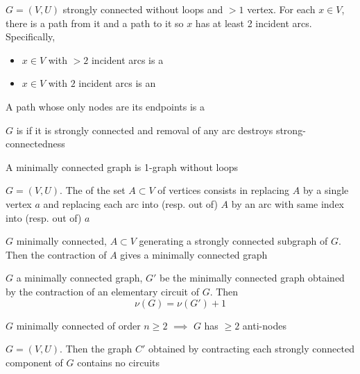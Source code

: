 \documentclass[aspectratio=43]{beamer}
\begin{document}
\begin{frame}
\begin{definition}
$G=(V,U)$ strongly connected without loops and $>1$ vertex. For each $x\in V$, there is a path from it and a path to it so $x$ has at least 2 incident arcs. Specifically,
\begin{itemize}
\item $x\in V$ with $>2$ incident arcs is a 
\item $x\in V$ with $2$ incident arcs is an 
\end{itemize}
A path whose only nodes are its endpoints is a 
\end{definition}
\vfill
\begin{definition}
$G$ is  if it is strongly connected and removal of any arc destroys strong-connectedness
\end{definition}
A minimally connected graph is 1-graph without loops
\vfill
\begin{definition}[Contraction]
$G=(V,U)$. The  of the set $A\subset V$ of vertices consists in replacing $A$ by a single vertex $a$ and replacing each arc into (resp. out of) $A$ by an arc with same index into (resp. out of) $a$
\end{definition}
\end{frame}


\begin{frame}
\begin{theorem}
$G$ minimally connected, $A\subset V$ generating a strongly connected subgraph of $G$. Then the contraction of $A$ gives a minimally connected graph
\end{theorem}
\end{frame}

\begin{frame} 
\begin{theorem}
$G$ a minimally connected graph, $G'$ be the minimally connected graph obtained by the contraction of an elementary circuit of $G$.	Then
\[
\nu(G)=\nu(G')+1
\]
\end{theorem}
\vfill
\begin{theorem}
$G$ minimally connected of order $n\geq 2$ $\implies$ $G$ has $\geq 2$ anti-nodes
\end{theorem}
\vfill
\begin{theorem}
$G=(V,U)$. Then the graph $C'$ obtained by contracting each strongly connected component of $G$ contains no circuits
\end{theorem}
\end{frame}
\end{document}
